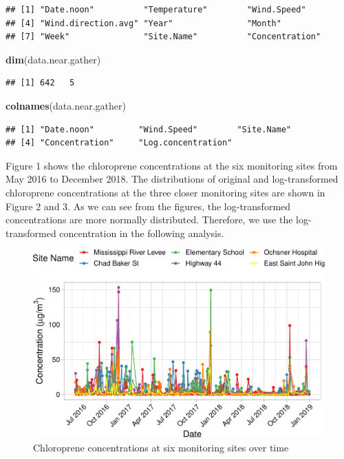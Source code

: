 \documentclass[12pt,]{article}
\newenvironment{Shaded}{\begin{snugshade}}{\end{snugshade}}
\newcommand{\KeywordTok}[1]{\textcolor[rgb]{0.13,0.29,0.53}{\textbf{#1}}}
\newcommand{\NormalTok}[1]{#1}
\begin{document}
\begin{verbatim}
## [1] "Date.noon"          "Temperature"        "Wind.Speed"        
## [4] "Wind.direction.avg" "Year"               "Month"             
## [7] "Week"               "Site.Name"          "Concentration"
\end{verbatim}

\begin{Shaded}
\begin{Highlighting}[]
\KeywordTok{dim}\NormalTok{(data.near.gather)}
\end{Highlighting}
\end{Shaded}

\begin{verbatim}
## [1] 642   5
\end{verbatim}

\begin{Shaded}
\begin{Highlighting}[]
\KeywordTok{colnames}\NormalTok{(data.near.gather)}
\end{Highlighting}
\end{Shaded}

\begin{verbatim}
## [1] "Date.noon"         "Wind.Speed"        "Site.Name"        
## [4] "Concentration"     "Log.concentration"
\end{verbatim}

Figure 1 shows the chloroprene concentrations at the six monitoring
sites from May 2016 to December 2018. The distributions of original and
log-transformed chloroprene concentrations at the three closer
monitoring sites are shown in Figure 2 and 3. As we can see from the
figures, the log-transformed concentrations are more normally
distributed. Therefore, we use the log-transformed concentration in the
following analysis.

\begin{figure}
\centering
\includegraphics{Li_ENV872_Project_files/figure-latex/unnamed-chunk-2-1.pdf}
\caption{Chloroprene concentrations at six monitoring sites over time}
\end{figure}
\end{document}
